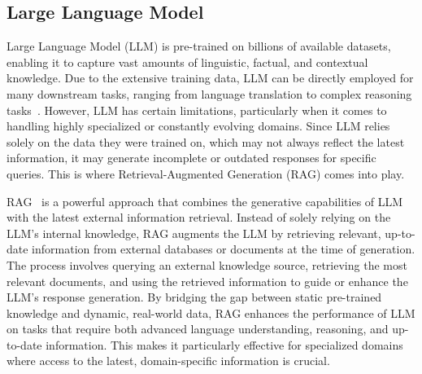 \subsection{Large Language Model}\label{sec:llm}
Large Language Model (LLM) is pre-trained on billions of available datasets, enabling it to capture vast amounts of linguistic, factual, and contextual knowledge. 
Due to the extensive training data, LLM can be directly employed for many downstream tasks, ranging from language translation to complex reasoning tasks~\cite{gpt,zhuge2021kaleido,docformer,kim2022ocr}.
However, LLM has certain limitations, particularly when it comes to handling highly specialized or constantly evolving domains.
Since LLM relies solely on the data they were trained on, which may not always reflect the latest information, it may generate incomplete or outdated responses for specific queries.
This is where Retrieval-Augmented Generation (RAG) comes into play.

RAG~\cite{fan2024survey,lewis2020retrieval} is a powerful approach that combines the generative capabilities of LLM with the latest external information retrieval. 
Instead of solely relying on the LLM's internal knowledge, RAG augments the LLM by retrieving relevant, up-to-date information from external databases or documents at the time of generation. 
The process involves querying an external knowledge source, retrieving the most relevant documents, and using the retrieved information to guide or enhance the LLM's response generation. 
By bridging the gap between static pre-trained knowledge and dynamic, real-world data, RAG enhances the performance of LLM on tasks that require both advanced language understanding, reasoning, and up-to-date information. This makes it particularly effective for specialized domains where access to the latest, domain-specific information is crucial.